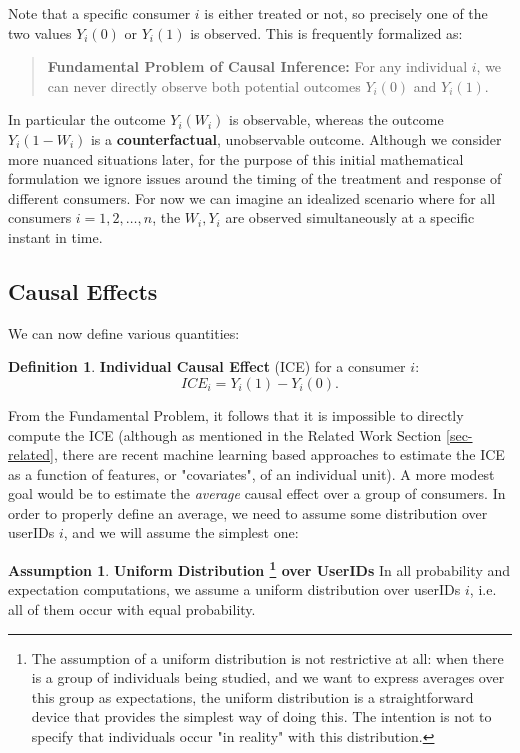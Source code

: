 \documentclass[11pt,a4paper]{article}
\theoremstyle{definition}
\newtheorem{definition}{Definition}[section]
\theoremstyle{remark}
\theoremstyle{definition}
\theoremstyle{definition}
\theoremstyle{definition}
\theoremstyle{definition}
\theoremstyle{definition}
\theoremstyle{definition}
\newtheorem{assumption}{Assumption
}[section]
\begin{document}
Note that a specific consumer $i$ is either treated or not, so precisely one of the two values $Y_i(0)$ or $Y_i(1)$ is observed. This is frequently formalized as:

\begin{quote}
	{\bf Fundamental Problem of Causal Inference:} For any individual $i$, we can never directly observe both potential outcomes $Y_i(0)$ and $Y_i(1)$. 
\end{quote}

   In particular the outcome $Y_i(W_i)$ is observable, whereas the outcome $Y_i(1 - W_i)$ is a {\bf counterfactual}, unobservable outcome. Although we consider more nuanced situations later, for the purpose of this initial mathematical formulation we ignore issues around the timing of the treatment and response of different consumers. For now we can imagine an idealized scenario where for all consumers $i = 1,2,\ldots,n$, the $W_i, Y_i$ are observed simultaneously at a specific instant in time. 

\subsection{Causal Effects}

We can now define various quantities:

	
\begin{definition}\label{ice}
{\bf Individual Causal Effect} (ICE) for a consumer $i$:
$$
ICE_i = Y_i(1) - Y_i(0).
$$
\end{definition}


From the Fundamental Problem, it follows that it is impossible to directly compute the ICE (although as mentioned in the Related Work Section \ref{sec-related}, there are recent machine learning based approaches to estimate the ICE as a function of features, or "covariates", of an individual unit). A more modest goal would be to estimate the \textit{average} causal effect over a group of consumers. In order to properly define an average, we need to assume some distribution over userIDs $i$, and we will assume the simplest one:

\begin{assumption}\textbf{Uniform Distribution
\footnote{The assumption of a uniform distribution is not restrictive at all: when there is a group of individuals being studied, and we want to express averages over this group as expectations, the uniform distribution is a straightforward device that provides the simplest way of doing this. The intention is not to specify that individuals occur "in reality" with this distribution.}
over UserIDs}
\label{ass-unif}
In all probability and expectation computations, we assume a uniform distribution over userIDs $i$, i.e. all of them occur with equal probability.
\end{assumption}
\end{document}
